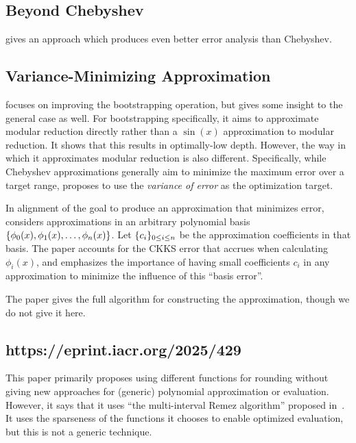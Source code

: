 \documentclass[../fheimpl.tex]{subfiles}
\begin{document}
    
    \subsection{Beyond Chebyshev}
    \cite{cryptoeprint:2019/688} gives an approach which produces even better error analysis than Chebyshev. 
    
    \subsection{Variance-Minimizing Approximation}
    \label{sec:varminapprox}
    \cite{cryptoeprint:2020/1549} focuses on improving the bootstrapping operation, but gives some insight to the general case as well. For bootstrapping specifically, it aims to approximate modular reduction directly rather than a $\sin(x)$ approximation to modular reduction. It shows that this results in optimally-low depth. However, the way in which it approximates modular reduction is also different. Specifically, while Chebyshev approximations generally aim to minimize the maximum error over a target range,\cite{cryptoeprint:2020/1549} proposes to use the \emph{variance of error} as the optimization target.
    
    In alignment of the goal to produce an approximation that minimizes error, \cite{cryptoeprint:2020/1549} considers approximations in an arbitrary polynomial basis $\{\phi_0(x), \phi_1(x), \ldots, \phi_n(x)\}$. Let $\{c_i\}_{0\le i \le n}$ be the approximation coefficients in that basis. The paper accounts for the CKKS error that accrues when calculating $\phi_i(x)$, and emphasizes the importance of having small coefficients $c_i$ in any approximation to minimize the influence of this ``basis error''.
    
    The paper gives the full algorithm for constructing the approximation, though we do not give it here.
	
    \subsection{https://eprint.iacr.org/2025/429}
    This paper primarily proposes using different functions for rounding without giving new approaches for (generic) polynomial approximation or evaluation. However, it says that it uses ``the multi-interval Remez algorithm'' proposed in~\cite{cryptoeprint:2020/1549}. It uses the sparseness of the functions it chooses to enable optimized evaluation, but this is not a generic technique.
\end{document}
